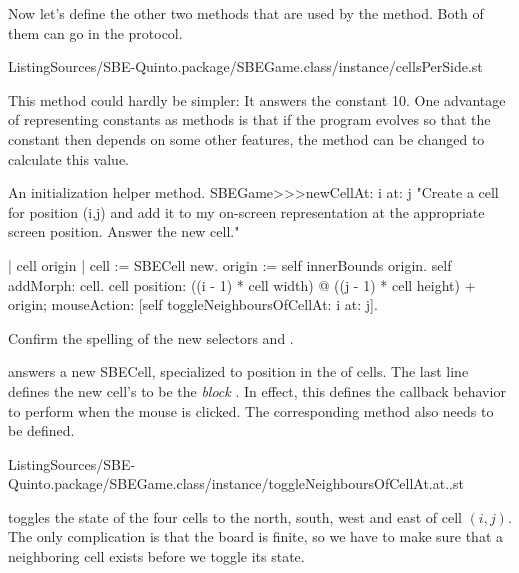 \documentclass[a4paper,10pt,twoside]{book}
\begin{document}
Now let's define the other two methods that are used by the  method.
Both of them can go in the  protocol.

%
{ListingSources/SBE-Quinto.package/SBEGame.class/instance/cellsPerSide.st}

This method could hardly be simpler:
It answers the constant 10.
One advantage of representing constants as methods is that if the program evolves so that the constant then depends on some other features, the method can be changed to calculate this value.

\begin{method}[newCellAt:at:]{An initialization helper method.}
SBEGame>>>newCellAt: i at: j
	"Create a cell for position (i,j) and add it to my on-screen
	representation at the appropriate screen position. Answer the new cell."

	| cell origin |
	cell := SBECell new.
	origin := self innerBounds origin.
	self addMorph: cell.
	cell
		position: ((i - 1) * cell width) @ ((j - 1) * cell height) + origin;
		mouseAction: [self toggleNeighboursOfCellAt: i at: j].
\end{method}

Confirm the spelling of the new selectors  and .

 answers a new SBECell, specialized to position  in the  of cells.
The last line defines the new cell's  to be the \emph{block}
\mbox{.}
In effect, this defines the callback behavior to perform when the mouse is clicked.
The corresponding method also needs to be defined.

%
{ListingSources/SBE-Quinto.package/SBEGame.class/instance/toggleNeighboursOfCellAt.at..st}

 toggles the state of the four cells to the north, south, west and east of cell $(i, j)$.
The only complication is that the board is finite, so we have to make sure that a neighboring cell exists before we toggle its state.
\end{document}
